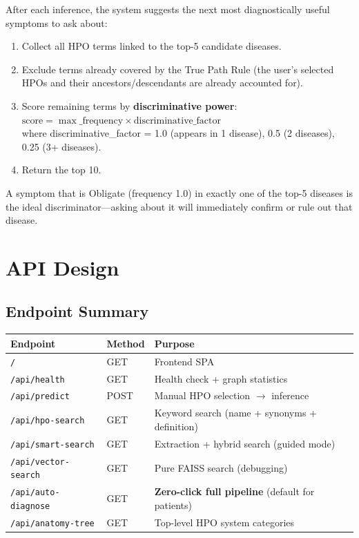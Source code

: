 \documentclass[11pt,a4paper]{article}
\begin{document}
After each inference, the system suggests the next most diagnostically useful symptoms to ask about:

\begin{enumerate}[leftmargin=*]
  \item Collect all HPO terms linked to the top-5 candidate diseases.
  \item Exclude terms already covered by the True Path Rule (the user's selected HPOs and their ancestors/descendants are already accounted for).
  \item Score remaining terms by \textbf{discriminative power}:\\
  $\text{score} = \max\_\text{frequency} \times \text{discriminative\_factor}$\\
  where discriminative\_factor = 1.0 (appears in 1 disease), 0.5 (2 diseases), 0.25 (3+ diseases).
  \item Return the top 10.
\end{enumerate}

A symptom that is Obligate (frequency 1.0) in exactly one of the top-5 diseases is the ideal discriminator—asking about it will immediately confirm or rule out that disease.

\newpage

\section{API Design}

\subsection{Endpoint Summary}

\begin{table}[H]
\centering
\begin{tabular}{@{}lll@{}}
\toprule
\textbf{Endpoint} & \textbf{Method} & \textbf{Purpose} \\
\midrule
\texttt{/} & GET & Frontend SPA \\
\texttt{/api/health} & GET & Health check + graph statistics \\
\texttt{/api/predict} & POST & Manual HPO selection $\rightarrow$ inference \\
\texttt{/api/hpo-search} & GET & Keyword search (name + synonyms + definition) \\
\texttt{/api/smart-search} & GET & Extraction + hybrid search (guided mode) \\
\texttt{/api/vector-search} & GET & Pure FAISS search (debugging) \\
\texttt{/api/auto-diagnose} & GET & \textbf{Zero-click full pipeline} (default for patients) \\
\texttt{/api/anatomy-tree} & GET & Top-level HPO system categories \\
\bottomrule
\end{tabular}
\end{table}
\end{document}
